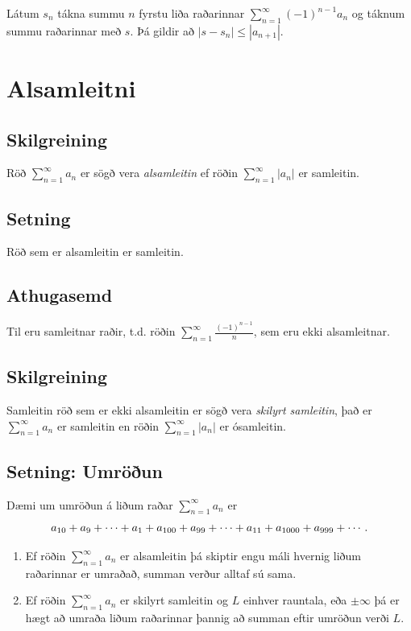 \documentclass[a4paper,10pt,icelandic]{sphinxmanual}
\begin{document}
Látum \(s_n\) tákna summu \(n\) fyrstu liða raðarinnar
\(\sum_{n=1}^\infty (-1)^{n-1}a_n\) og táknum summu raðarinnar með
\(s\). Þá gildir að \(|s-s_n|\leq |a_{n+1}|\).


\section{Alsamleitni}
\label{kafli09:index-10}\label{kafli09:alsamleitni}

\subsection{Skilgreining}
\label{kafli09:id12}
Röð \(\sum_{n=1}^\infty a_n\) er sögð vera \emph{alsamleitin} ef röðin
\(\sum_{n=1}^\infty |a_n|\) er samleitin.


\subsection{Setning}
\label{kafli09:id13}
Röð sem er alsamleitin er samleitin.


\subsection{Athugasemd}
\label{kafli09:id14}
Til eru samleitnar raðir, t.d. röðin
\(\sum_{n=1}^\infty \frac{(-1)^{n-1}}{n}\), sem eru ekki
alsamleitnar.


\subsection{Skilgreining}
\label{kafli09:id15}\label{kafli09:index-11}
Samleitin röð sem er ekki alsamleitin er sögð vera
\emph{skilyrt samleitin}, það er \(\sum_{n=1}^\infty a_n\) er samleitin
en röðin \(\sum_{n=1}^\infty |a_n|\) er ósamleitin.


\subsection{Setning: Umröðun}
\label{kafli09:setning-umroun}
Dæmi um umröðun á liðum raðar \(\sum_{n=1}^\infty a_n\) er
\begin{gather}
\begin{split}a_{10}+a_9+\cdots+a_1+a_{100}+a_{99}+\cdots+a_{11}+
a_{1000}+a_{999}+\cdots.\end{split}\notag
\end{gather}\begin{enumerate}
\item {} 
Ef röðin \(\sum_{n=1}^\infty a_n\) er alsamleitin þá skiptir
engu máli hvernig liðum raðarinnar er umraðað, summan verður alltaf
sú sama.

\item {} 
Ef röðin \(\sum_{n=1}^\infty a_n\) er skilyrt samleitin og
\(L\) einhver rauntala, eða \(\pm\infty\) þá er hægt að
umraða liðum raðarinnar þannig að summan eftir umröðun verði
\(L\).

\end{enumerate}
\end{document}
